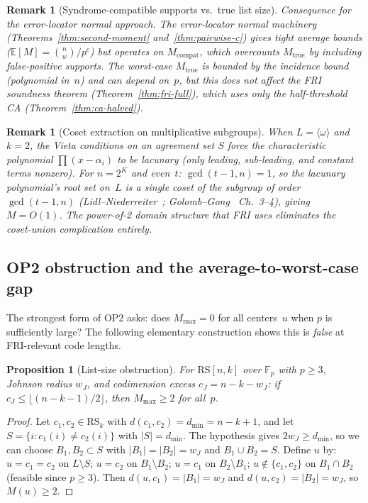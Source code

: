 \documentclass[11pt]{article}
\newtheorem{proposition}[theorem]{Proposition}
\newtheorem{remark}[theorem]{Remark}
\newcommand{\FF}{\mathbb{F}}
\newcommand{\RS}{\mathrm{RS}}
\newcommand{\EE}{\mathbb{E}}
\begin{document}
\begin{remark}[Syndrome-compatible supports vs.\ true list size]
\smallskip\noindent\emph{Consequence for the error-locator normal approach.}
The error-locator normal machinery (Theorems~\ref{thm:second-moment} and~\ref{thm:pairwise-c}) gives tight \emph{average} bounds ($\EE[M] = \binom{n}{w}/p^c$) but operates on $M_{\mathrm{compat}}$, which overcounts $M_{\mathrm{true}}$ by including false-positive supports.
The worst-case $M_{\mathrm{true}}$ is bounded by the incidence bound (polynomial in~$n$) and can depend on~$p$, but this does not affect the FRI soundness theorem (Theorem~\ref{thm:fri-full}), which uses only the half-threshold CA (Theorem~\ref{thm:ca-halved}).
\end{remark}

\begin{remark}[Coset extraction on multiplicative subgroups]
\label{rem:coset}
When $L = \langle\omega\rangle$ and $k = 2$, the Vieta conditions on an agreement set $S$ force the characteristic polynomial $\prod(x - \alpha_i)$ to be \emph{lacunary} (only leading, sub-leading, and constant terms nonzero). For $n = 2^K$ and even~$t$: $\gcd(t{-}1, n) = 1$, so the lacunary polynomial's root set on~$L$ is a single coset of the subgroup of order $\gcd(t{-}1, n)$ (Lidl--Niederreiter~\cite{LidlNiederreiter}; Golomb--Gong~\cite{GolombGong} Ch.~3--4), giving $M = O(1)$. The power-of-2 domain structure that FRI uses eliminates the coset-union complication entirely.
\end{remark}

\subsection{OP2 obstruction and the average-to-worst-case gap}

The strongest form of OP2 asks: does $M_{\max} = 0$ for all centers~$u$ when $p$ is sufficiently large? The following elementary construction shows this is \emph{false} at FRI-relevant code lengths.

\begin{proposition}[List-size obstruction]
\label{prop:m2-obstruction}
For $\RS[n,k]$ over $\FF_p$ with $p \geq 3$, Johnson radius $w_J$, and codimension excess $c_J = n - k - w_J$: if $c_J \leq \lfloor(n{-}k{-}1)/2\rfloor$, then $M_{\max} \geq 2$ for all~$p$.
\end{proposition}

\begin{proof}
Let $c_1, c_2 \in \RS_k$ with $d(c_1, c_2) = d_{\min} = n{-}k{+}1$, and let $S = \{i : c_1(i) \neq c_2(i)\}$ with $|S| = d_{\min}$. The hypothesis gives $2w_J \geq d_{\min}$, so we can choose $B_1, B_2 \subset S$ with $|B_1| = |B_2| = w_J$ and $B_1 \cup B_2 = S$. Define $u$ by: $u = c_1 = c_2$ on $L \setminus S$; $u = c_2$ on $B_1 \setminus B_2$; $u = c_1$ on $B_2 \setminus B_1$; $u \notin \{c_1, c_2\}$ on $B_1 \cap B_2$ (feasible since $p \geq 3$). Then $d(u, c_1) = |B_1| = w_J$ and $d(u, c_2) = |B_2| = w_J$, so $M(u) \geq 2$.
\end{proof}
\end{document}
